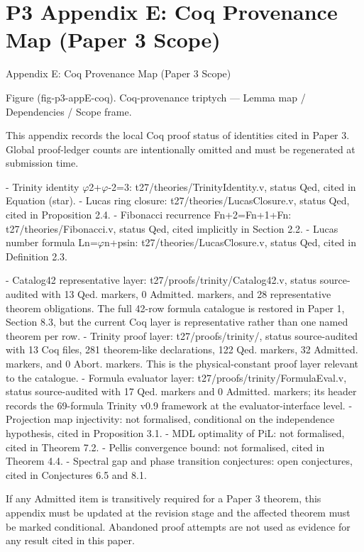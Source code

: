 
\section{P3 Appendix E: Coq Provenance Map (Paper 3 Scope)}

Appendix E: Coq Provenance Map (Paper 3 Scope)

  Figure (fig-p3-appE-coq). Coq-provenance triptych --- Lemma map / Dependencies / Scope frame.

  This appendix records the local Coq proof status of identities cited in Paper 3. Global
  proof-ledger counts are intentionally omitted and must be regenerated at submission
  time.

  - Trinity identity $\varphi$2+$\varphi$-2=3: t27/theories/TrinityIdentity.v, status Qed, cited in Equation
  (star).
  - Lucas ring closure: t27/theories/LucasClosure.v, status Qed, cited in Proposition 2.4.
  - Fibonacci recurrence Fn+2=Fn+1+Fn: t27/theories/Fibonacci.v, status Qed, cited
  implicitly in Section 2.2.
  - Lucas number formula Ln=$\varphi$n+psin: t27/theories/LucasClosure.v, status Qed, cited in
  Definition 2.3.

  - Catalog42 representative layer: t27/proofs/trinity/Catalog42.v, status source-audited
  with 13 Qed. markers, 0 Admitted. markers, and 28 representative theorem obligations.
  The full 42-row formula catalogue is restored in Paper 1, Section 8.3, but the current
  Coq layer is representative rather than one named theorem per row.
  - Trinity proof layer: t27/proofs/trinity/, status source-audited with 13 Coq files, 281
  theorem-like declarations, 122 Qed. markers, 32 Admitted. markers, and 0 Abort.
  markers. This is the physical-constant proof layer relevant to the catalogue.
  - Formula evaluator layer: t27/proofs/trinity/FormulaEval.v, status source-audited with
  17 Qed. markers and 0 Admitted. markers; its header records the 69-formula Trinity
  v0.9 framework at the evaluator-interface level.
  - Projection map injectivity: not formalised, conditional on the independence
  hypothesis, cited in Proposition 3.1.
  - MDL optimality of PiL: not formalised, cited in Theorem 7.2.
  - Pellis convergence bound: not formalised, cited in Theorem 4.4.
  - Spectral gap and phase transition conjectures: open conjectures, cited in Conjectures
  6.5 and 8.1.

  If any Admitted item is transitively required for a Paper 3 theorem, this appendix must
  be updated at the revision stage and the affected theorem must be marked conditional.
  Abandoned proof attempts are not used as evidence for any result cited in this paper.

